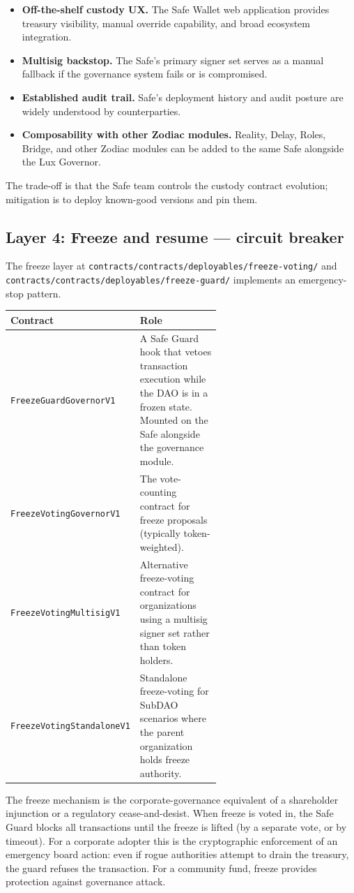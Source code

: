 \documentclass[11pt,letterpaper]{article}
\begin{document}
\begin{itemize}
\item \textbf{Off-the-shelf custody UX.} The Safe Wallet web application provides treasury visibility, manual override capability, and broad ecosystem integration.
\item \textbf{Multisig backstop.} The Safe's primary signer set serves as a manual fallback if the governance system fails or is compromised.
\item \textbf{Established audit trail.} Safe's deployment history and audit posture are widely understood by counterparties.
\item \textbf{Composability with other Zodiac modules.} Reality, Delay, Roles, Bridge, and other Zodiac modules can be added to the same Safe alongside the Lux Governor.
\end{itemize}

The trade-off is that the Safe team controls the custody contract evolution; mitigation is to deploy known-good versions and pin them.

\subsection{Layer 4: Freeze and resume --- circuit breaker}

The freeze layer at \texttt{contracts/contracts/deployables/freeze-voting/} and \texttt{contracts/contracts/deployables/freeze-guard/} implements an emergency-stop pattern.

\begin{longtable}{lp{0.6\linewidth}}
\toprule
\textbf{Contract} & \textbf{Role} \\
\midrule
\texttt{FreezeGuardGovernorV1} & A Safe Guard hook that vetoes transaction execution while the DAO is in a frozen state. Mounted on the Safe alongside the governance module. \\
\texttt{FreezeVotingGovernorV1} & The vote-counting contract for freeze proposals (typically token-weighted). \\
\texttt{FreezeVotingMultisigV1} & Alternative freeze-voting contract for organizations using a multisig signer set rather than token holders. \\
\texttt{FreezeVotingStandaloneV1} & Standalone freeze-voting for SubDAO scenarios where the parent organization holds freeze authority. \\
\bottomrule
\end{longtable}

The freeze mechanism is the corporate-governance equivalent of a shareholder injunction or a regulatory cease-and-desist. When freeze is voted in, the Safe Guard blocks all transactions until the freeze is lifted (by a separate vote, or by timeout). For a corporate adopter this is the cryptographic enforcement of an emergency board action: even if rogue authorities attempt to drain the treasury, the guard refuses the transaction. For a community fund, freeze provides protection against governance attack.
\end{document}
